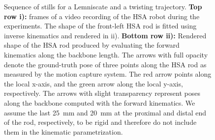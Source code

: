 \begin{figure}[t]
    \centering
    
    \caption{Sequence of stills for a Lemniscate and a twisting trajectory. 
    \textbf{Top row i):} frames of a video recording of the HSA robot during the experiments. The shape of the front-left HSA rod is fitted using inverse kinematics and rendered in ii).
    \textbf{Bottom row ii):} Rendered shape of the HSA rod produced by evaluating the forward kinematics along the backbone length. The arrows with full opacity denote the ground-truth pose of three points along the HSA rod as measured by the motion capture system. The red arrow points along the local x-axis, and the green arrow along the local y-axis, respectively. The arrows with slight transparency represent poses along the backbone computed with the forward kinematics.
    We assume the last \SI{25}{mm} and \SI{20}{mm} at the proximal and distal end of the rod, respectively, to be rigid and therefore do not include them in the kinematic parametrization.
    }\label{fig:hsamodel:experiment_inverse_kinematics_sequence_of_stills}
\end{figure}

